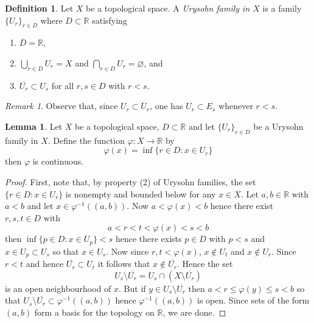 \documentclass{book}
\theoremstyle{definition}
\newtheorem{lemma}[theorem]{Lemma}
\newtheorem{definition}{Definition}[section]
\theoremstyle{remark}
\newtheorem{remark}{Remark}[section]
\newcommand{\R}{\mathbb{R}}
\begin{document}
\begin{definition}
Let $X$ be a topological space. A \textit{Urysohn family in $X$} is a family $\{U_r\}_{r\in D}$ where $D\subset\R$ satisfying
\begin{enumerate}
    \item $\overline D=\R$,
    \item $\bigcup_{r\in D}U_r=X$ and $\bigcap_{r\in D}U_r=\varnothing$, and
    \item $\overline{U_r}\subset U_s$ for all $r,s\in D$ with $r<s$.
\end{enumerate}
\end{definition}
\begin{remark}
Observe that, since $U_r\subset\overline U_r$, one has $U_r\subset E_s$ whenever $r<s$.
\end{remark}
\begin{lemma}
\label{urysohncont}
Let $X$ be a topological space, $D\subset\R$ and let $\{U_r\}_{r\in D}$ be a Urysohn family in $X$. Define the function $\varphi:X\to\R$ by
$$\varphi(x)=\inf\{r\in D:x\in U_r\}$$
then $\varphi$ is continuous.
\end{lemma}
\begin{proof}
First, note that, by property (2) of Urysohn families, the set $\{r\in D:x\in U_r\}$ is nonempty and bounded below for any $x\in X$. Let $a,b\in\R$ with $a<b$ and let $x\in\varphi^{-1}((a,b))$. Now $a<\varphi(x)<b$ hence there exist $r,s,t\in D$ with
$$a<r<t<\varphi(x)<s<b$$
then $\inf\{p\in D:x\in U_p\}<s$ hence there exists $p\in D$ with $p<s$ and $x\in U_p\subset U_s$ so that $x\in U_s$. Now since $r,t<\varphi(x)$, $x\notin U_t$ and $x\notin U_r$. Since $r<t$ and hence $\overline{U_r}\subset U_t$ it follows that $x\notin\overline{U_r}$. Hence the set
$$U_s\setminus\overline{U_r}=U_s\cap(X\setminus\overline{U_r})$$
is an open neighbourhood of $x$. But if $y\in U_s\setminus\overline{U_r}$ then $a<r\leq\varphi(y)\leq s<b$ so that $U_s\setminus\overline{U_r}\subset\varphi^{-1}((a,b))$ hence $\varphi^{-1}((a,b))$ is open. Since sets of the form $(a,b)$ form a basis for the topology on $\R$, we are done.
\end{proof}
\end{document}
